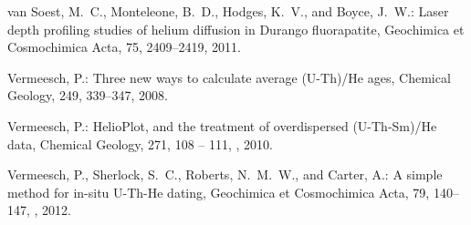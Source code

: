 \documentclass{article}
\begin{document}
\begin{thebibliography}{24}
{van Soest}, M.~C., {Monteleone}, B.~D., {Hodges}, K.~V., and {Boyce}, J.~W.:
  {Laser depth profiling studies of helium diffusion in Durango fluorapatite},
  Geochimica et Cosmochimica Acta, 75, 2409--2419, 2011.

Vermeesch, P.: Three new ways to calculate average ({U}-{T}h)/{H}e ages,
  Chemical Geology, 249, 339--347, 2008.

Vermeesch, P.: {HelioPlot, and the treatment of overdispersed (U-Th-Sm)/He
  data}, Chemical Geology, 271, 108 -- 111,
  , 2010.

{Vermeesch}, P., {Sherlock}, S.~C., {Roberts}, N.~M.~W., and {Carter}, A.: {A
  simple method for in-situ U-Th-He dating}, Geochimica et Cosmochimica Acta,
  79, 140--147, , 2012.

\end{thebibliography}
\end{document}
